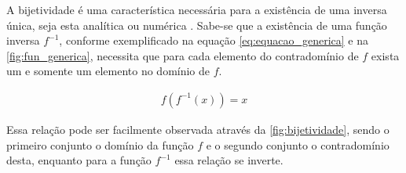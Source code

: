 A bijetividade é uma característica necessária para a existência de uma inversa única, seja esta analítica ou numérica \cite{weisstein}. Sabe-se que a existência de uma função inversa $f^{-1}$, conforme exemplificado na equação \ref{eq:equacao_generica} e na \autoref{fig:fun_generica}, necessita que para cada elemento do contradomínio de $f$ exista um e somente um elemento no domínio de $f$.

\begin{align}
f(f^{-1}(x)) = x
\label{eq:equacao_generica}
\end{align}


Essa relação pode ser facilmente observada através da \autoref{fig:bijetividade}, sendo o primeiro conjunto o domínio da função $f$ e o segundo conjunto o contradomínio desta, enquanto para a função $f^{-1}$ essa relação se inverte.

